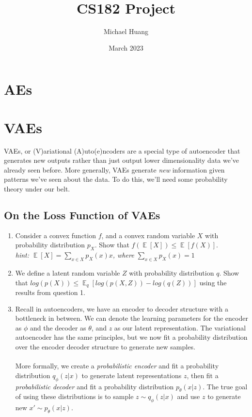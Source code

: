 \documentclass{article}
\title{CS182 Project}
\author{Michael Huang}
\date{March 2023}
\DeclareMathOperator{\EX}{\mathbb{E}}%
\begin{document}
\maketitle

\section{AEs}
\section{VAEs}
VAEs, or (V)ariational (A)uto(e)ncoders are a special type of autoencoder that generates new outputs rather than just output lower dimensionality data we've already seen before. More generally, VAEs generate \textit{new} information given patterns we've seen about the data. To do this, we'll need some probability theory under our belt.
\subsection{On the Loss Function of VAEs}
\begin{enumerate}
    \item Consider a convex function $f$, and a convex random variable $X$ with probability distribution $p_X$. Show that $f(\EX[X]) \leq \EX[f(X)]$.
    \\
    \textit{hint: $\EX[X] = \sum_{x \in X} p_X(x) x$, where $\sum_{x \in X}p_X(x) = 1$}
    \item We define a latent random variable $Z$ with probability distribution $q$. Show that $log(p(X)) \leq \EX_q[log(p(X, Z)) - log(q(Z))]$ using the results from question 1.

    \item Recall in autoencoders, we have an encoder to decoder structure with a bottleneck in between. We can denote the learning parameters for the encoder as $\phi$ and the decoder as $\theta$, and $z$ as our latent representation. The variational autoencoder has the same principles, but we now fit a probability distribution over the encoder decoder structure to generate new samples.
    \\
    \\
    More formally, we create a \textit{probabilistic encoder} and fit a probability distribution $q_{\phi}(z|x)$ to generate latent representations $z$, then fit a \textit{probabilistic decoder} and fit a probability distribution $p_{\theta}(x|z)$. The true goal of using these distributions is to sample $z \sim q_{\phi}(z|x)$ and use $z$ to generate new $x' \sim p_{\theta}(x|z)$.
    
\end{enumerate}
\end{document}
